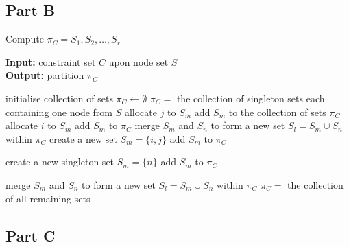 \documentclass[a4paper, 11pt]{article}
\begin{document}
	\subsection{Part B}
	\label{section:2B}
	\begin{algorithm}
		\caption{Compute $\pi_{C} = S_{1}, S_{2}, \ldots, S_{r}$}
		\label{alg:partition}
		\textbf{Input:} constraint set $C$ upon node set $S$ \\
		\textbf{Output:} partition $\pi_{C}$
		
		\begin{algorithmic}[1]
			\STATE initialise collection of sets $\pi_{C} \leftarrow \emptyset$
				\RETURN $\pi_{C} = $ the collection of singleton sets each containing one node from $S$
			\ELSE
						\STATE allocate $j$ to $S_{m}$
						\STATE add $S_{m}$ to the collection of sets $\pi_{C}$
						\STATE allocate $i$ to $S_{m}$
						\STATE add $S_{m}$ to $\pi_{C}$
						\STATE merge $S_{m}$ and $S_{n}$ to form a new set $S_{l} = S_{m} \cup S_{n}$ within $\pi_{C}$
						\STATE create a new set $S_{m} = \{i, j\}$
						\STATE add $S_{m}$ to $\pi_{C}$
					\ENDIF
				\ENDFOR
			
					\STATE create a new singleton set $S_{m} = \{n\}$
					\STATE add $S_{m}$ to $\pi_{C}$
				\ENDFOR
			
						\STATE merge $S_{m}$ and $S_{n}$ to form a new set $S_{l} = S_{m} \cup S_{n}$ within $\pi_{C}$
					\ENDIF
				\ENDFOR
				\RETURN $\pi_{C} = $ the collection of all remaining sets
			\ENDIF
	\end{algorithmic}
	\end{algorithm}
	
	\subsection{Part C}
	\label{section:2C}
	
\end{document}
